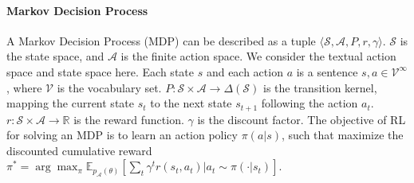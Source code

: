 \documentclass{article} %
\theoremstyle{plain}
\theoremstyle{definition}
\theoremstyle{remark}
\begin{document}
\paragraph{Markov Decision Process}
A Markov Decision Process (MDP) can be described as a tuple $\langle\mathcal{S},\mathcal{A},P,r,\gamma\rangle$. $\mathcal{S}$ is the state space, and $\mathcal{A}$ is the finite action space. We consider the textual action space and state space here. Each state $s$ and each action $a$ is a sentence $s,a\in \mathcal{V}^\infty$, where $\mathcal{V}$ is the vocabulary set. $P:\mathcal{S}\times\mathcal{A}\rightarrow \Delta(\mathcal{S})$ is the transition kernel, mapping the current state $s_t$ to the next state $s_{t+1}$ following the action $a_t$. $r:\mathcal{S}\times\mathcal{A}\rightarrow \mathbb{R}$ is the reward function. $\gamma$ is the discount factor. %
The objective of RL for solving an MDP is to learn an action policy $\pi(a|s)$, such that maximize the discounted cumulative reward $\pi^*=\arg\max_\pi \mathbb{E}_{p_\mathcal{A}(\theta)}[\sum_t \gamma^t r(s_t,a_t)|a_t \sim \pi(\cdot|s_t)]$.
\fi

\end{document}
